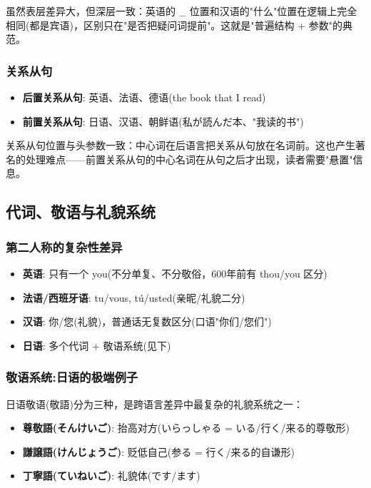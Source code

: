 虽然表层差异大，但深层一致：英语的 \_ 位置和汉语的"什么"位置在逻辑上完全相同(都是宾语)，区别只在"是否把疑问词提前"。这就是"普遍结构 + 参数"的典范。

\subsubsection{关系从句}

\begin{itemize}
    \item \textbf{后置关系从句}: 英语、法语、德语(the book that I read)
    \item \textbf{前置关系从句}: 日语、汉语、朝鲜语(私が読んだ本、"我读的书")
\end{itemize}

关系从句位置与头参数一致：中心词在后语言把关系从句放在名词前。这也产生著名的处理难点——前置关系从句的中心名词在从句之后才出现，读者需要"悬置"信息。

\subsection{代词、敬语与礼貌系统}

\subsubsection{第二人称的复杂性差异}

\begin{itemize}
    \item \textbf{英语}: 只有一个 you(不分单复、不分敬俗，600年前有 thou/you 区分)
    \item \textbf{法语/西班牙语}: tu/vous, tú/usted(亲昵/礼貌二分)
    \item \textbf{汉语}: 你/您(礼貌)，普通话无复数区分(口语"你们/您们")
    \item \textbf{日语}: 多个代词 + 敬语系统(见下)
\end{itemize}

\subsubsection{敬语系统:日语的极端例子}

日语敬语(敬語)分为三种，是跨语言差异中最复杂的礼貌系统之一：
\begin{itemize}
    \item \textbf{尊敬語(そんけいご)}: 抬高对方(いらっしゃる = いる/行く/来る的尊敬形)
    \item \textbf{謙譲語(けんじょうご)}: 贬低自己(参る = 行く/来る的自谦形)
    \item \textbf{丁寧語(ていねいご)}: 礼貌体(です/ます)
\end{itemize}

